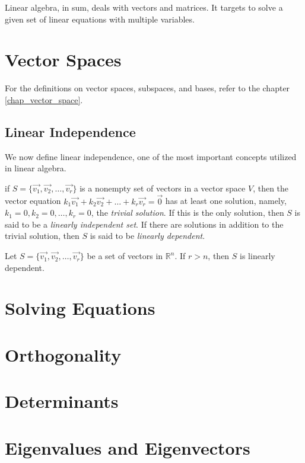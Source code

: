 \documentclass{report}
\begin{document}
Linear algebra, in sum, deals with vectors and matrices. It targets to solve a given set of linear equations with multiple variables.
	\section{Vector Spaces}
		For the definitions on vector spaces, subspaces, and bases, refer to the chapter \ref{chap_vector_space}.
		\subsection{Linear Independence}
		We now define linear independence, one of the most important concepts utilized in linear algebra.
		\begin{defn}
			if $S=\{\vec{v_1}, \vec{v_2}, \dots, \vec{v_r}\}$ is a nonempty set of vectors in a vector space $V$, then the vector equation $k_1\vec{v_1}+k_2\vec{v_2}+\dots+k_r\vec{v_r}=\vec{0}$ has at least one solution, namely, $k_1=0, k_2=0, \dots, k_r=0$, the \emph{trivial solution}. If this is the only solution, then $S$ is said to be a \emph{linearly independent set}. If there are solutions in addition to the trivial solution, then $S$ is said to be \emph{linearly dependent}.
		\end{defn}
		
		\begin{thm}
			Let $S=\{\vec{v_1}, \vec{v_2}, \dots, \vec{v_r}\}$ be a set of vectors in $\mathbb{R}^n$. If $r>n$, then $S$ is linearly dependent.
		\end{thm}
	\section{Solving Equations}
		\subsection{}
	\section{Orthogonality}
		\subsection{}
	\section{Determinants}
		\subsection{}
	\section{Eigenvalues and Eigenvectors}
		\subsection{}
\end{document}
